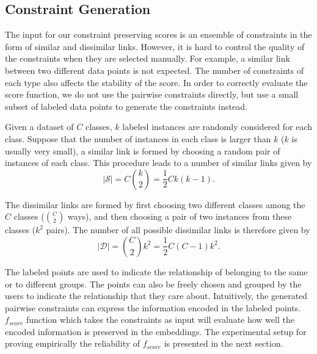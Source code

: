 \subsection{Constraint Generation}\label{sec:xp:constraint}

The input for our constraint preserving scores is an ensemble of constraints in the form of similar and dissimilar links.
However, it is hard to control the quality of the constraints when they are selected manually.
For example, a similar link between two different data points is not expected.
The number of constraints of each type also affects the stability of the score.
In order to correctly evaluate the score function, we do not use the pairwise constraints directly, but use a small subset of labeled data points to generate the constraints instead.

Given a dataset of $C$ classes, $k$ labeled instances are randomly considered for each class.
Suppose that the number of instances in each class is larger than $k$ ($k$ is usually very small),
a similar link is formed by choosing a random pair of instances of each class.
This procedure leads to a number of similar links given by
\begin{equation}\label{eq:|S|}
    |\mathcal{S}| = C {k \choose 2} = \frac{1}{2} C k (k - 1).
\end{equation}

The dissimilar links are formed by first choosing two different classes among the $C$ classes (${C \choose 2}$ ways),
and then choosing a pair of two instances from these classes ($k^2$ pairs).
The number of all possible dissimilar links is therefore given by
\begin{equation}\label{eq:|D|}
    |\mathcal{D}| = {C \choose 2} k^2 = \frac{1}{2} C (C - 1) k^2.
\end{equation}

The labeled points are used to indicate the relationship of belonging to the same or to different groups.
The points can also be freely chosen and grouped by the users to indicate the relationship that they care about.
Intuitively, the generated pairwise constraints can express the information encoded in the labeled points.
$f_{score}$ function which takes the constraints as input will evaluate how well the encoded information is preserved in the embeddings.
The experimental setup for proving empirically the reliability of $f_{score}$ is presented in the next section.

